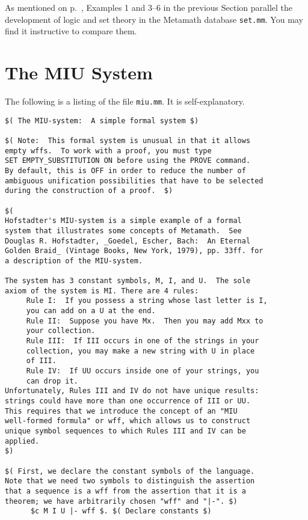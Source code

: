 As mentioned on p.~\pageref{exampleref}, Examples 1 and 3--6 in the
previous Section parallel the development of logic and set theory in the
Metamath database
\texttt{set.mm}. You may
find it instructive to compare them.


\chapter{The MIU System}
\label{MIU}

The following is a listing of the file \texttt{miu.mm}.  It is self-explanatory.


\begin{verbatim}
$( The MIU-system:  A simple formal system $)

$( Note:  This formal system is unusual in that it allows
empty wffs.  To work with a proof, you must type
SET EMPTY_SUBSTITUTION ON before using the PROVE command.
By default, this is OFF in order to reduce the number of
ambiguous unification possibilities that have to be selected
during the construction of a proof.  $)

$(
Hofstadter's MIU-system is a simple example of a formal
system that illustrates some concepts of Metamath.  See
Douglas R. Hofstadter, _Goedel, Escher, Bach:  An Eternal
Golden Braid_ (Vintage Books, New York, 1979), pp. 33ff. for
a description of the MIU-system.

The system has 3 constant symbols, M, I, and U.  The sole
axiom of the system is MI. There are 4 rules:
     Rule I:  If you possess a string whose last letter is I,
     you can add on a U at the end.
     Rule II:  Suppose you have Mx.  Then you may add Mxx to
     your collection.
     Rule III:  If III occurs in one of the strings in your
     collection, you may make a new string with U in place
     of III.
     Rule IV:  If UU occurs inside one of your strings, you
     can drop it.
Unfortunately, Rules III and IV do not have unique results:
strings could have more than one occurrence of III or UU.
This requires that we introduce the concept of an "MIU
well-formed formula" or wff, which allows us to construct
unique symbol sequences to which Rules III and IV can be
applied.
$)

$( First, we declare the constant symbols of the language.
Note that we need two symbols to distinguish the assertion
that a sequence is a wff from the assertion that it is a
theorem; we have arbitrarily chosen "wff" and "|-". $)
      $c M I U |- wff $. $( Declare constants $)


\end{verbatim}
